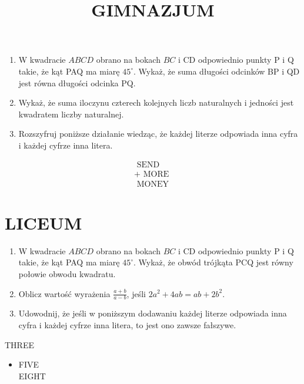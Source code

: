 \documentclass[10pt]{article}
\title{GIMNAZJUM }
\author{}
\date{}
\begin{document}
\maketitle
\begin{enumerate}
  \item W kwadracie \(A B C D\) obrano na bokach \(B C\) i CD odpowiednio punkty P i Q takie, że kąt PAQ ma miarę \(45^{\circ}\). Wykaż, że suma długości odcinków BP i QD jest równa długości odcinka PQ.
  \item Wykaż, że suma iloczynu czterech kolejnych liczb naturalnych i jedności jest kwadratem liczby naturalnej.
  \item Rozszyfruj poniższe działanie wiedząc, że każdej literze odpowiada inna cyfra i każdej cyfrze inna litera.
\end{enumerate}

\[
\begin{array}{r}
\text { SEND } \\
+ \text { MORE } \\
\hline \text { MONEY }
\end{array}
\]

\section*{LICEUM}
\begin{enumerate}
  \item W kwadracie \(A B C D\) obrano na bokach \(B C\) i CD odpowiednio punkty P i Q takie, że kąt PAQ ma miarę \(45^{\circ}\). Wykaż, że obwód trójkąta PCQ jest równy połowie obwodu kwadratu.
  \item Oblicz wartość wyrażenia \(\frac{a+b}{a-b}\), jeśli \(2 a^{2}+4 a b=a b+2 b^{2}\).
  \item Udowodnij, że jeśli w poniższym dodawaniu każdej literze odpowiada inna cyfra i każdej cyfrze inna litera, to jest ono zawsze fałszywe.
\end{enumerate}

THREE

\begin{itemize}
  \item FIVE\\
EIGHT
\end{itemize}
\end{document}
